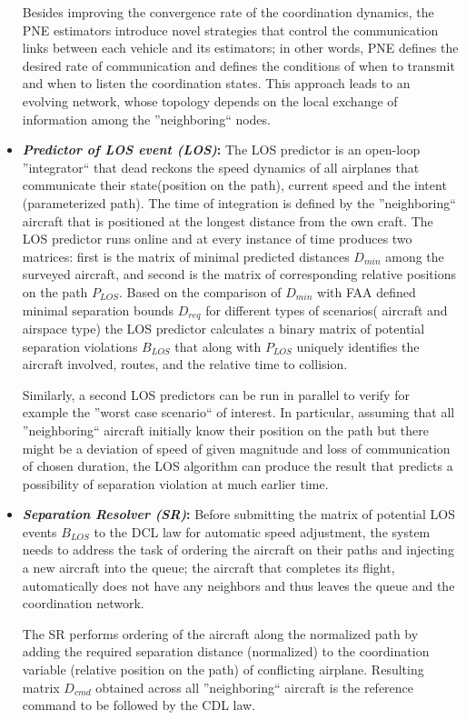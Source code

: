 \documentclass[letter,onecolumn,12pt]{aiaa-tc}
\newcommand{\1}{1_n}
\begin{document}
\begin{itemize}
Besides improving  the convergence rate of the coordination dynamics, the PNE estimators introduce novel strategies that control the communication links between each vehicle and its estimators; in other words, PNE defines the desired rate of communication and defines the conditions of when to transmit and when to listen the coordination states. This approach leads to an evolving network, whose topology depends on the local exchange of information among the ''neighboring`` nodes.

\item \textbf{\emph{Predictor of LOS event (LOS)}:} The LOS predictor is an open-loop ''integrator`` that dead reckons the speed dynamics of all airplanes that communicate their state(position on the path), current speed and the intent (parameterized path). The time of integration is defined by the ''neighboring`` aircraft that is positioned at the longest distance from the own craft. The LOS predictor runs online and at every instance of time produces two matrices: first is the matrix of minimal predicted distances $D_{min}$ among the surveyed aircraft, and second is the matrix of corresponding relative positions on the path $P_{LOS}$. Based on the comparison of $D_{min}$ with FAA defined minimal separation bounds $D_{req}$ for different types of scenarios( aircraft and airspace type) the LOS predictor calculates a binary matrix of potential separation violations $B_{LOS}$ that along with $P_{LOS}$ uniquely identifies the aircraft involved, routes, and the relative time to collision.

Similarly, a second LOS predictors can be run in parallel to verify for example the ''worst case scenario`` of interest. In particular, assuming that all ''neighboring`` aircraft initially know their  position on the path but there might be a deviation of speed of given magnitude and loss of communication of chosen duration, the LOS algorithm can produce the result that predicts a possibility of separation violation at much earlier time.

\item \textbf{\emph{Separation Resolver (SR)}:} Before submitting the matrix of potential LOS events $B_{LOS}$ to the DCL law for automatic speed adjustment, the system needs to address the task of ordering the aircraft on their paths and injecting a new aircraft into the queue; the aircraft that completes its flight, automatically does not have any neighbors and thus leaves the queue and the coordination network.

The SR performs ordering of the aircraft along the normalized path by adding the required separation distance (normalized) to the coordination variable (relative position on the path) of conflicting airplane. Resulting matrix $D_{cmd}$ obtained across all ''neighboring`` aircraft is the reference command to be followed by the CDL law.


\end{itemize}
\end{document}
